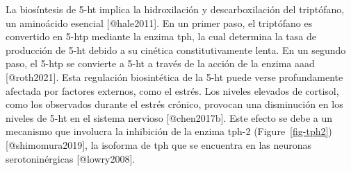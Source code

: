 \documentclass[
  11pt]{../MastersDoctoralThesisUNAM}
\begin{document}
La biosíntesis de \ac{5-ht} implica la hidroxilación y descarboxilación
del triptófano, un aminoácido esencial {[}@hale2011{]}. En un primer
paso, el triptófano es convertido en \ac{5-htp} mediante la enzima
\ac{tph}, la cual determina la tasa de producción de \ac{5-ht} debido a
su cinética constitutivamente lenta. En un segundo paso, el \ac{5-htp}
se convierte a \ac{5-ht} a través de la acción de la enzima \ac{aaad}
{[}@roth2021{]}. Esta regulación biosintética de la \ac{5-ht} puede
verse profundamente afectada por factores externos, como el estrés. Los
niveles elevados de cortisol, como los observados durante el estrés
crónico, provocan una disminución en los niveles de \ac{5-ht} en el
sistema nervioso {[}@chen2017b{]}. Este efecto se debe a un mecanismo
que involucra la \colorbox{BurntOrange}{inhibición de la enzima}
\ac{tph}-2 (Figure~\ref{fig-tph2}) {[}@shimomura2019{]}, la isoforma de
\ac{tph} que se encuentra en las neuronas serotoninérgicas
{[}@lowry2008{]}.
\end{document}
